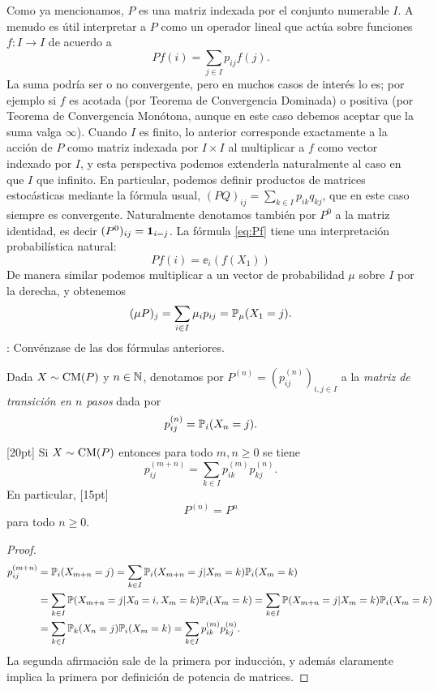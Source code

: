 Como ya mencionamos, $P$ es una matriz indexada por el conjunto numerable $I$.
A menudo es útil interpretar a $P$ como un operador lineal que actúa sobre funciones $f\!:I\longrightarrow I$ de acuerdo a 
\begin{equation}
Pf(i)=\sum_{j\in I}p_{ij}f(j).\label{eq:Pf}
\end{equation}
La suma podría ser o no convergente, pero en muchos casos de interés lo es; por ejemplo si $f$ es acotada (por Teorema de Convergencia Dominada) o positiva (por Teorema de Convergencia Monótona, aunque en este caso debemos aceptar que la suma valga $\infty$).
Cuando $I$ es finito, lo anterior corresponde exactamente a la acción de $P$ como matriz indexada por $I\times I$ al multiplicar a $f$ como vector indexado por $I$, y esta perspectiva podemos extenderla naturalmente al caso en que $I$ que infinito.
\lsep
En particular, podemos definir productos de matrices estocásticas mediante la fórmula usual, $(PQ)_{ij}=\sum_{k\in I}p_{ik}q_{kj}$, que en este caso siempre es convergente.
Naturalmente denotamos también por $P^0$ a la matriz identidad, es decir $(P^0)_{ij}=\mathbf{1}_{i=j}$.
\lsep
La fórmula \eqref{eq:Pf} tiene una interpretación probabilística natural:
\[Pf(i)=\ee_{i}(f(X_1))\]
De manera similar podemos multiplicar a un vector de probabilidad $\mu$ sobre $I$ por la derecha, y obtenemos
\[(\mu P)_j=\sum_{i\in I}\mu_ip_{ij}=\mathbb{P}_\mu(X_1=j).\]
\uexer: Convénzase de las dos fórmulas anteriores.

\begin{defn}
Dada $X\sim\text{\upshape{CM}}(P)$ y $n\in\mathbb{N}$, denotamos por $P^{(n)}=(p^{(n)}_{ij})_{i,j\in I}$ a la \emph{matriz de transición en $n$ pasos} dada por
\[p^{(n)}_{ij}=\mathbb{P}_i(X_n=j).\]
\end{defn}

\begin{thm}[20pt]
Si $X\sim\text{\upshape{CM}}(P)$ entonces para todo $m,n\geq0$ se tiene
\[p^{(m+n)}_{ij}=\sum_{k\in I}p^{(m)}_{ik}p^{(n)}_{kj}.\]
En particular, [15pt]
\[P^{(n)}=P^n\] 
para todo $n\geq0$.
\end{thm}

\begin{proof}
\begin{align}
p^{(m+n)}_{ij}&=\pp_i(X_{m+n}=j)=\sum_{k\in I}\pp_i(X_{m+n}=j|X_m=k)\pp_i(X_m=k)\\
&=\sum_{k\in I}\pp(X_{m+n}=j|X_0=i,X_m=k)\pp_i(X_m=k)=\sum_{k\in I}\pp(X_{m+n}=j|X_m=k)\pp_i(X_m=k)\hspace{-18pt}\\
&=\sum_{k\in I}\pp_k(X_{n}=j)\pp_i(X_m=k)=\sum_{k\in I}p^{(m)}_{ik}p^{(n)}_{kj}.
\end{align}
La segunda afirmación sale de la primera por inducción, y además claramente implica la primera por definición de potencia de matrices.
\end{proof}

